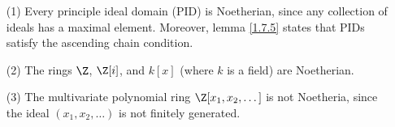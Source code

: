 \begin{example}\label{example_1.1}
    \begin{enumerate}
        \item[(1)] Every principle ideal domain (PID) is Noetherian, since any
            collection of ideals has a maximal element. Moreover, lemma
            \ref{1.7.5} states that PIDs satisfy the ascending chain condition.

        \item[(2)] The rings $\Z$, $\Z[i]$, and $k[x]$ (where $k$ is a field)
            are Noetherian.

        \item[(3)] The multivariate polynomial ring $\Z[x_1, x_2, \dots]$ is not
            Noetheria, since the ideal $(x_1, x_2, \dots)$ is not finitely
            generated.
    \end{enumerate}
\end{example}

